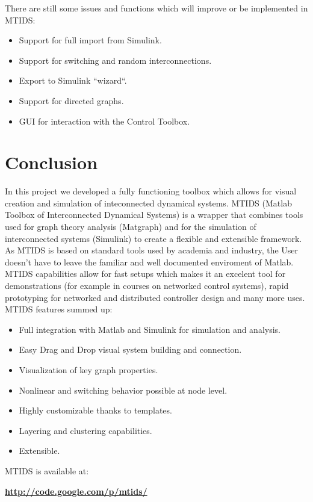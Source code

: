 \documentclass[a4paper,twoside, openright,12pt]{report}
\begin{document}
There are still some issues and functions which will improve or be implemented in MTIDS:
\begin{itemize}
 \item Support for full import from Simulink.
 \item Support for switching and random interconnections.
 \item Export to Simulink ``wizard``.
 \item Support for directed graphs.
 \item GUI for interaction with the Control Toolbox.
\end{itemize}
\vspace{5cm} 
\pagebreak 

\section{Conclusion}
In this project we developed a fully functioning toolbox which allows for visual creation and simulation of inteconnected dynamical systems.
MTIDS (Matlab Toolbox of Interconnected Dynamical Systems) is a wrapper that combines tools used for graph theory analysis (Matgraph) and 
for the simulation of interconnected systems (Simulink) to create a flexible and extensible framework.
\\

As MTIDS is based on standard tools used by academia and industry, the User doesn't have to leave the familiar and well documented enviroment of Matlab.
\\ MTIDS capabilities allow for fast setups which makes it an excelent tool for demonstrations (for example in courses on networked control systems),
rapid prototyping for networked and distributed controller design and many more uses.
\linebreak
\newline  
MTIDS features summed up:
\begin{itemize}
 \item Full integration with Matlab and Simulink for simulation and analysis.
 \item Easy Drag and Drop visual system building and connection.
 \item Visualization of key graph properties. 
 \item Nonlinear and switching behavior possible at node level.
 \item Highly customizable thanks to templates.
 \item Layering and clustering capabilities.
 \item Extensible.
\end{itemize}
\smallskip 
MTIDS is available at:
\begin{center}
\textbf{ \href{http://code.google.com/p/mtids/}{http://code.google.com/p/mtids/}}
\end{center}
\end{document}
